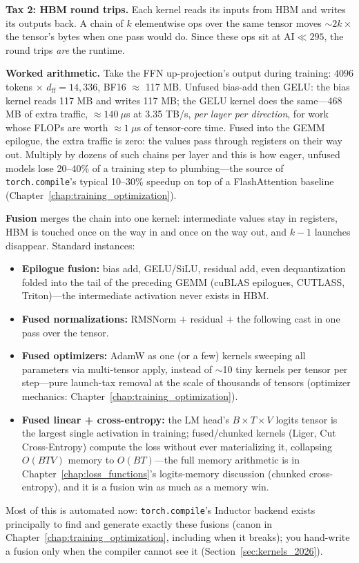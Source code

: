 \textbf{Tax 2: HBM round trips.} Each kernel reads its inputs from HBM and writes its outputs back. A chain of $k$ elementwise ops over the same tensor moves $\sim 2k \times$ the tensor's bytes when one pass would do. Since these ops sit at $\text{AI} \ll 295$, the round trips \textit{are} the runtime.

\textbf{Worked arithmetic.} Take the FFN up-projection's output during training: $4096$ tokens $\times$ $d_{\text{ff}} = 14{,}336$, BF16 $\approx$ 117 MB. Unfused bias-add then GELU: the bias kernel reads 117 MB and writes 117 MB; the GELU kernel does the same---468 MB of extra traffic, $\approx 140\ \mu$s at 3.35 TB/s, \textit{per layer per direction}, for work whose FLOPs are worth $\approx 1\ \mu$s of tensor-core time. Fused into the GEMM epilogue, the extra traffic is zero: the values pass through registers on their way out. Multiply by dozens of such chains per layer and this is how eager, unfused models lose 20--40\% of a training step to plumbing---the source of \texttt{torch.compile}'s typical 10--30\% speedup on top of a FlashAttention baseline (Chapter~\ref{chap:training_optimization}).

\textbf{Fusion} merges the chain into one kernel: intermediate values stay in registers, HBM is touched once on the way in and once on the way out, and $k{-}1$ launches disappear. Standard instances:
\begin{itemize}
    \item \textbf{Epilogue fusion:} bias add, GELU/SiLU, residual add, even dequantization folded into the tail of the preceding GEMM (cuBLAS epilogues, CUTLASS, Triton)---the intermediate activation never exists in HBM.
    \item \textbf{Fused normalizations:} RMSNorm $+$ residual $+$ the following cast in one pass over the tensor.
    \item \textbf{Fused optimizers:} AdamW as one (or a few) kernels sweeping all parameters via multi-tensor apply, instead of $\sim$10 tiny kernels per tensor per step---pure launch-tax removal at the scale of thousands of tensors (optimizer mechanics: Chapter~\ref{chap:training_optimization}).
    \item \textbf{Fused linear + cross-entropy:} the LM head's $B \times T \times V$ logits tensor is the largest single activation in training; fused/chunked kernels (Liger, Cut Cross-Entropy) compute the loss without ever materializing it, collapsing $O(BTV)$ memory to $O(BT)$---the full memory arithmetic is in Chapter~\ref{chap:loss_functions}'s logits-memory discussion (chunked cross-entropy), and it is a fusion win as much as a memory win.
\end{itemize}
Most of this is automated now: \texttt{torch.compile}'s Inductor backend exists principally to find and generate exactly these fusions (canon in Chapter~\ref{chap:training_optimization}, including when it breaks); you hand-write a fusion only when the compiler cannot see it (Section~\ref{sec:kernels_2026}).

